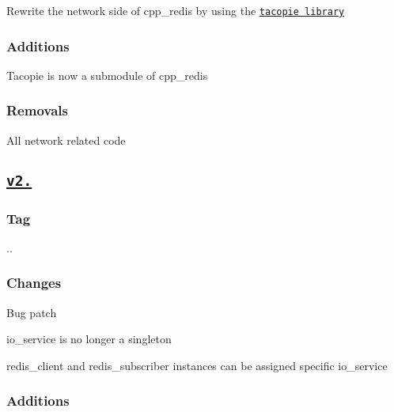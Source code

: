 \begin{DoxyItemize}
\item Rewrite the network side of cpp\+\_\+redis by using the \href{https://github.com/Cylix/tacopie}{\tt tacopie library} \subsubsection*{Additions}
\end{DoxyItemize}


\begin{DoxyItemize}
\item Tacopie is now a submodule of cpp\+\_\+redis \subsubsection*{Removals}
\end{DoxyItemize}


\begin{DoxyItemize}
\item All network related code
\end{DoxyItemize}

\subsection*{\href{https://github.com/Cylix/cpp_redis/releases/tag/2.2}{\tt v2.}}

\subsubsection*{Tag}

{.}. \subsubsection*{Changes}


\begin{DoxyItemize}
\item Bug patch
\item io\+\_\+service is no longer a singleton
\item {\ttfamily redis\+\_\+client} and {\ttfamily redis\+\_\+subscriber} instances can be assigned specific io\+\_\+service \subsubsection*{Additions}
\end{DoxyItemize}



